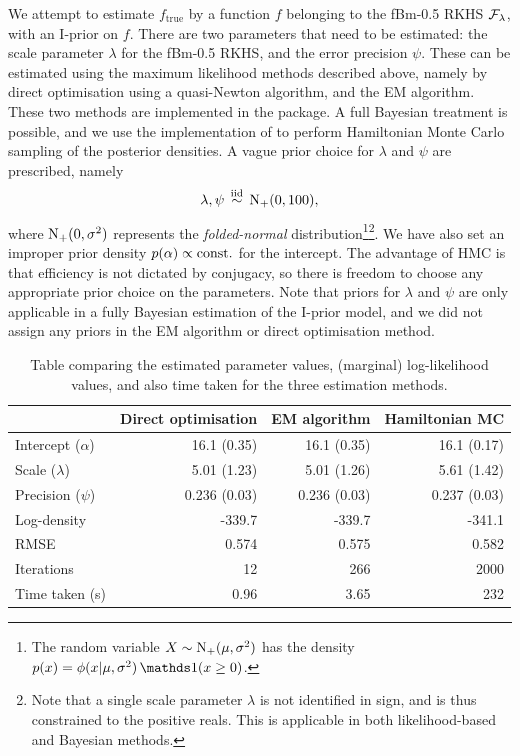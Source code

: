 We attempt to estimate $f_\text{true}$ by a function $f$ belonging to the fBm-0.5 RKHS ${\mathcal F}_\lambda$, with an I-prior on $f$.
There are two parameters that need to be estimated: the scale parameter $\lambda$ for the fBm-0.5 RKHS, and the error precision $\psi$.
These can be estimated using the maximum likelihood methods described above, namely by direct optimisation using a quasi-Newton algorithm, and the EM algorithm.
These two methods are implemented in the  package. 
A full Bayesian treatment is possible, and we use the  implementation of  to perform Hamiltonian Monte Carlo sampling of the posterior densities.
A vague prior choice for $\lambda$ and $\psi$ are prescribed, namely
\[
  \lambda,\psi \,\overset{\text{iid}}{\sim}\, \operatorname{N}_+(0,100),
\]
where $\operatorname{N}_+(0,\sigma^2)$ represents the \emph{folded-normal} distribution\footnote{The random variable $X \sim \operatorname{N}_+(\mu,\sigma^2)$ has the density $p(x) = \phi(x|\mu,\sigma^2)\ind(x \geq 0)$.}\footnote{Note that a single scale parameter $\lambda$ is not identified in sign, and is thus constrained to the positive reals. This is applicable in both likelihood-based and Bayesian methods.}.
We have also set an improper prior density $p(\alpha) \propto \text{const.}\hspace{0.01em}$ for the intercept.
The advantage of HMC is that efficiency is not dictated by conjugacy, so there is freedom to choose any appropriate prior choice on the parameters.
Note that priors for $\lambda$ and $\psi$ are only applicable in a fully Bayesian estimation of the I-prior model, and we did not assign any priors in the EM algorithm or direct optimisation method.
\label{errata6}

\begin{table}[hbt]
\centering
\caption{Table comparing the estimated parameter values, (marginal) log-likelihood values, and also time taken for the three estimation methods.}
\label{tab:comparemethodsestimate}
\begin{tabular}{@{}lrrr@{}}
\toprule
               & Direct optimisation & EM algorithm & Hamiltonian MC          \\ \midrule
Intercept ($\alpha$)      & 16.1 (0.35)           & 16.1 (0.35)    & 16.1 (0.17)  \\
Scale ($\lambda$)      & 5.01 (1.23)         & 5.01 (1.26)  & 5.61 (1.42)     \\
Precision ($\psi$)         & 0.236 (0.03)        & 0.236 (0.03) & 0.237 (0.03)\\[0.5em]
Log-density    & -339.7              & -339.7       & -341.1                  \\
RMSE\footnotemark & 0.574               & 0.575        & 0.582                   \\[0.5em]
Iterations     & 12                  & 266          & 2000                    \\
Time taken (s) & 0.96                & 3.65         & 232                     \\ \bottomrule
\end{tabular}
\end{table}

